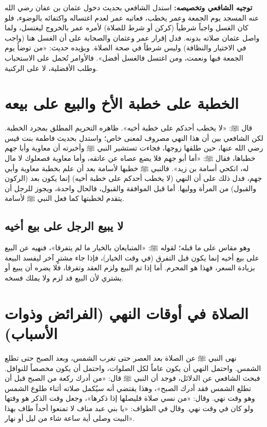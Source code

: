 \textbf{توجيه الشافعي وتخصيصه:}
استدل الشافعي بحديث دخول عثمان بن عفان رضي الله عنه المسجد يوم الجمعة وعمر يخطب، فعاتبه عمر لعدم اغتساله واكتفائه بالوضوء، فلو كان الغسل واجباً شرطياً (كركن أو شرط للصلاة) لأمره عمر بالخروج ليغتسل، ولما واصل عثمان صلاته بدونه. فدل إقرار عمر وعثمان والصحابة على أن الغسل هنا (واجب في الاختيار والنظافة) وليس شرطاً في صحة الصلاة.
ويؤيده حديث: «من توضأ يوم الجمعة فبها ونعمت، ومن اغتسل فالغسل أفضل». فالأوامر تُحمل على الاستحباب وطلب الأفضلية، لا على الركنية.

\section{الخطبة على خطبة الأخ والبيع على بيعه}
قال ﷺ: «لا يخطب أحدكم على خطبة أخيه». ظاهره التحريم المطلق بمجرد الخطبة.
لكن الشافعي بين أن هذا النهي مصروف لمعنى خاص؛ واستدل بحديث فاطمة بنت قيس رضي الله عنها، حين طلقها زوجها، فجاءت تستشير النبي ﷺ وأخبرته أن معاوية وأبا جهم خطباها، فقال ﷺ: «أما أبو جهم فلا يضع عصاه عن عاتقه، وأما معاوية فصعلوك لا مال له، انكحي أسامة بن زيد».
فالنبي ﷺ خطبها لأسامة بعد أن علم بخطبة معاوية وأبي جهم، فدل ذلك على أن النهي (لا يخطب أحدكم على خطبة أخيه) إنما يكون بعد (الركون والقبول) من المرأة ووليها. أما قبل الموافقة والقبول، فالحال واحدة، ويجوز للرجل أن يتقدم لخطبتها كما فعل النبي ﷺ لأسامة.

\subsection{لا يبيع الرجل على بيع أخيه}
وهو مقاس على ما قبله؛ لقوله ﷺ: «المتبايعان بالخيار ما لم يتفرقا»، فنهيه عن البيع على بيع أخيه إنما يكون قبل التفرق (في وقت الخيار)، فإذا جاء مشترٍ آخر ليفسد البيعة بزيادة السعر، فهذا هو المحرم. أما إذا تم البيع ولزم العقد وتفرقا، فلا يضره أن يبيع أو يشتري لأن البيع قد لزم ولا يملك فسخه.

\section{الصلاة في أوقات النهي (الفرائض وذوات الأسباب)}
نهى النبي ﷺ عن الصلاة بعد العصر حتى تغرب الشمس، وبعد الصبح حتى تطلع الشمس. 
واحتمل النهي أن يكون عاماً لكل الصلوات، واحتمل أن يكون مخصصاً للنوافل. فبحث الشافعي عن الدلائل، فوجد أن النبي ﷺ قال: «من أدرك ركعة من الصبح قبل أن تطلع الشمس فقد أدرك الصبح»، وهذا يقتضي أنه سيُكمل صلاته أثناء طلوع الشمس وهو وقت نهي. وقال: «من نسي صلاة فليصلها إذا ذكرها»، وجعل وقت الذكر هو وقتها ولو كان في وقت نهي.
وقال في الطواف: «يا بني عبد مناف لا تمنعوا أحداً طاف بهذا البيت وصلى أية ساعة شاء من ليل أو نهار».

